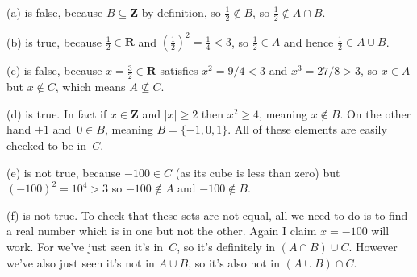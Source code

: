 \documentclass[10pt]{article}
\newcommand{\R}{\mathbf{R}}
\newcommand{\Z}{\mathbf{Z}}
\begin{document}
\medskip{}

(a) is false, because $B\subseteq\Z$ by definition, so $\frac{1}{2}\not\in B$, so $\frac{1}{2}\not\in A\cap B$.

(b) is true, because $\frac12\in\R$ and $\left(\frac12\right)^2=\frac14<3$, so $\frac12\in A$ and hence $\frac12\in A\cup B$.

(c) is false, because $x=\frac32\in\R$ satisfies $x^2=9/4<3$ and $x^3=27/8>3$, so $x\in A$ but $x\not\in C$, which means $A\not\subseteq C$.

(d) is true. In fact if $x\in\Z$ and $|x|\geq2$ then $x^2\geq4$, meaning $x\not\in B$. On the other hand $\pm1$ and~$0\in B$, meaning $B=\{-1,0,1\}$. All of these elements are easily checked to be in~$C$.

(e) is not true, because $-100\in C$ (as its cube is less than zero) but $(-100)^2=10^4>3$ so $-100\not\in A$ and $-100\not\in B$.

(f) is not true. To check that these sets are not equal, all we need to do is to find a real number which is in one but not the other. Again I claim $x=-100$ will work. For we've just seen it's in~$C$, so it's definitely in $(A\cap B)\cup C$. However we've also just seen it's not in $A\cup B$, so it's also not in $(A\cup B)\cap C$.
\end{document}
